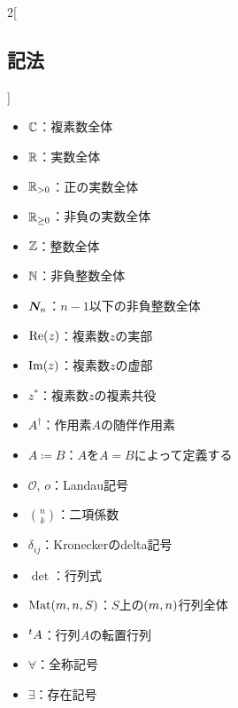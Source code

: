 \documentclass[b5paper,draft,oneside,openany]{ltjsbook} %
\begin{document}
\columnseprule=0.5pt
\begin{multicols}{2}[\subsection*{記法}]
    \begin{itemize}
        \item $\mathbb{C}$：複素数全体
        \item $\mathbb{R}$：実数全体
        \item $\mathbb{R}_{> 0}$：正の実数全体
        \item $\mathbb{R}_{\geq 0}$：非負の実数全体
        \item $\mathbb{Z}$：整数全体
        \item $\mathbb{N}$：非負整数全体
        \item $\bm{N}_{n}$：$n-1$以下の非負整数全体
        \item $\re{z}$：複素数$z$の実部
        \item $\im{z}$：複素数$z$の虚部
        \item $z^*$：複素数$z$の複素共役
        \item $A^\dagger$：作用素$A$の随伴作用素
        \item $A\coloneqq B$：$A$を$A=B$によって定義する
        \item $\mathcal{O}$, $o$：Landau記号
        \item $\binom{n}{k}$：二項係数
        \item $\delta_{ij}$：Kroneckerのdelta記号
        \item $\det$：行列式
        \item $\Mat{m}{n}{S}$：$S$上の$\pare{m,n}$行列全体
        \item ${}^t{A}$：行列$A$の転置行列
        \item $\forall$：全称記号
        \item $\exists$：存在記号
    \end{itemize}
\end{multicols}
\columnseprule=0.0pt
\end{document}
